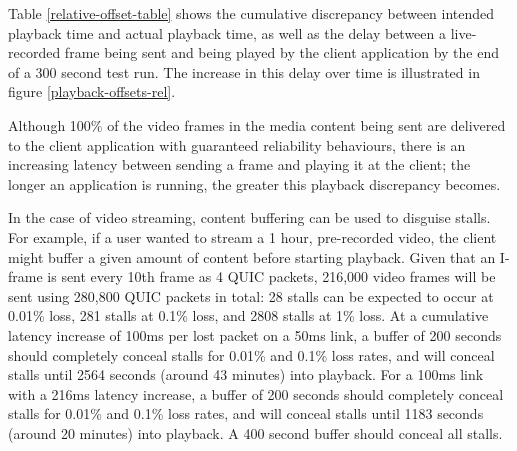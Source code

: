 \documentclass{mpaper}
\begin{document}
Table \ref{relative-offset-table} shows the cumulative discrepancy between intended playback time and actual playback time, as well as the delay between a live-recorded frame being sent and being played by the client application by the end of a 300 second test run. The increase in this delay over time is illustrated in figure \ref{playback-offsets-rel}.

Although 100\% of the video frames in the media content being sent are delivered to the client application with guaranteed reliability behaviours, there is an increasing latency between sending a frame and playing it at the client; the longer an application is running, the greater this playback discrepancy becomes.


In the case of video streaming, content buffering can be used to disguise stalls. For example, if a user wanted to stream a 1 hour, pre-recorded video, the client might buffer a given amount of content before starting playback. Given that an I-frame is sent every 10th frame as 4 QUIC packets, 216,000 video frames will be sent using 280,800 QUIC packets in total: 28 stalls can be expected to occur at 0.01\% loss, 281 stalls at 0.1\% loss, and 2808 stalls at 1\% loss. At a cumulative latency increase of 100ms per lost packet on a 50ms link, a buffer of 200 seconds should completely conceal stalls for 0.01\% and 0.1\% loss rates, and will conceal stalls until 2564 seconds (around 43 minutes) into playback. For a 100ms link with a 216ms latency increase, a buffer of 200 seconds should completely conceal stalls for 0.01\% and 0.1\% loss rates, and will conceal stalls until 1183 seconds (around 20 minutes) into playback. A 400 second buffer should conceal all stalls.
\end{document}

